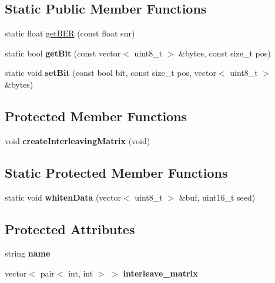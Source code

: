 \subsection*{Static Public Member Functions}
\begin{DoxyCompactItemize}
\item 
static float \hyperlink{classFEC_aaf1d4259c61fe117e086ad07871d22a3}{get\+B\+ER} (const float snr)
\item 
\mbox{\label{classFEC_a92c9959e49decd014767e50404b7d168}} 
static bool {\bfseries get\+Bit} (const vector$<$ uint8\+\_\+t $>$ \&bytes, const size\+\_\+t pos)
\item 
\mbox{\label{classFEC_aa04c28eb445a68ef068632734126529c}} 
static void {\bfseries set\+Bit} (const bool bit, const size\+\_\+t pos, vector$<$ uint8\+\_\+t $>$ \&bytes)
\end{DoxyCompactItemize}
\subsection*{Protected Member Functions}
\begin{DoxyCompactItemize}
\item 
\mbox{\label{classFEC_a74f7ba3b1a613afc35c4dc9526350919}} 
void {\bfseries create\+Interleaving\+Matrix} (void)
\end{DoxyCompactItemize}
\subsection*{Static Protected Member Functions}
\begin{DoxyCompactItemize}
\item 
\mbox{\label{classFEC_a428e7fa69a863496db90089dd4bc21a1}} 
static void {\bfseries whiten\+Data} (vector$<$ uint8\+\_\+t $>$ \&buf, uint16\+\_\+t seed)
\end{DoxyCompactItemize}
\subsection*{Protected Attributes}
\begin{DoxyCompactItemize}
\item 
\mbox{\label{classFEC_abb6d143bc35d00ea0d302b1f70af9851}} 
string {\bfseries name}
\item 
\mbox{\label{classFEC_a4ba61eb1ae60f3d485fce36872c5ce63}} 
vector$<$ pair$<$ int, int $>$ $>$ {\bfseries interleave\+\_\+matrix}
\end{DoxyCompactItemize}


